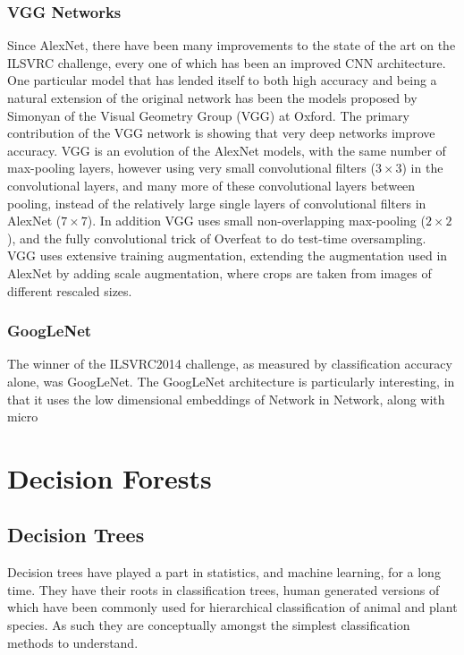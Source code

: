 \documentclass[thesis]{subfiles}
\begin{document}
\subsubsection{VGG Networks}
Since AlexNet, there have been many improvements to the state of the art on the ILSVRC challenge, every one of which has been an improved CNN architecture. One particular model that has lended itself to both high accuracy and being a natural extension of the original network has been the models proposed by Simonyan \etal of the Visual Geometry Group (VGG) at Oxford. The primary contribution of the VGG network is showing that very deep networks improve accuracy. VGG is an evolution of the AlexNet models, with the same number of max-pooling layers, however using very small convolutional filters ($3 \times 3$) in the convolutional layers, and many more of these convolutional layers between pooling, instead of the relatively large single layers of convolutional filters in AlexNet ($7\times 7$). In addition VGG uses small non-overlapping max-pooling ($2\times 2$), and the fully convolutional trick of Overfeat to do test-time oversampling. VGG uses extensive training augmentation, extending the augmentation used in AlexNet by adding scale augmentation, where crops are taken from images of different rescaled sizes. 


\subsubsection{GoogLeNet}
The winner of the ILSVRC2014 challenge, as measured by classification accuracy alone, was GoogLeNet. The GoogLeNet architecture is particularly interesting, in that it uses the low dimensional embeddings of Network in Network, along with micro

\section{Decision Forests}
\subsection{Decision Trees}
Decision trees have played a part in statistics, and machine learning, for a long time. They have their roots in classification trees, human generated versions of which have been commonly used for hierarchical classification of animal and plant species. As such they are conceptually amongst the simplest classification methods to understand. 
\end{document}
